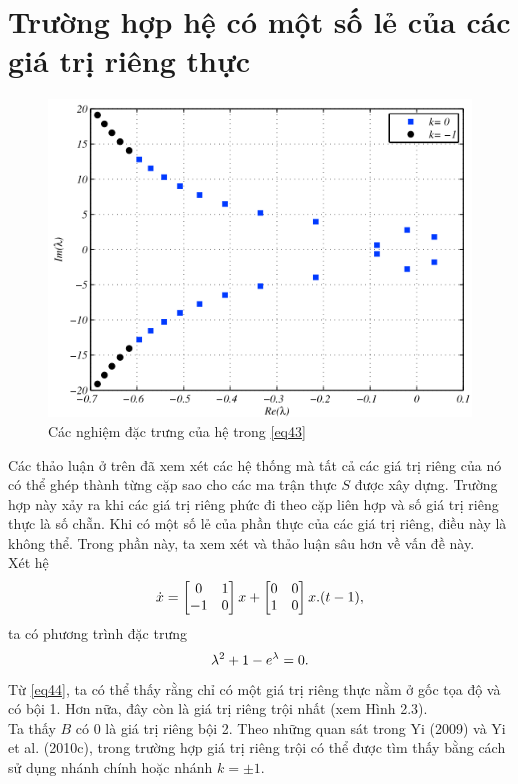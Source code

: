 \section{Trường hợp hệ có một số lẻ của các giá trị riêng thực}
\begin{figure}[h!]
	\centering
	\includegraphics[scale= 0.7]{"./Hinh/Hinh 3"}
	\caption[Các nghiệm đặc trưng của hệ trong  \eqref{43} ] {Các nghiệm đặc trưng của hệ trong  \eqref{eq43}}
	\label{fig:hinh-2}
\end{figure}
Các thảo luận ở trên đã xem xét các hệ thống mà tất cả các giá trị riêng của nó có thể ghép thành từng cặp sao cho các ma trận thực $S$ được xây dựng. 
Trường hợp này xảy ra khi các giá trị riêng phức đi theo cặp liên hợp và số giá trị riêng thực là số chẵn. Khi có một số lẻ của phần thực của các giá trị riêng, điều này là không thể. Trong phần này, ta xem xét và thảo luận sâu hơn về vấn đề này.\\
Xét hệ
\begin{equation}\label{eq43}
\dot{x} = \begin{bmatrix} 0 & 1\\ - 1 & 0 \end{bmatrix}x + \begin{bmatrix} 0 & 0 \\ 1 & 0 \end{bmatrix}x.(t - 1),
\end{equation}
ta có phương trình đặc trưng
\begin{equation}\label{eq44}
	\lambda^2 + 1 - e^{\lambda} = 0.
\end{equation}
Từ \eqref{eq44}, ta có thể thấy rằng chỉ có một giá trị riêng thực nằm ở gốc tọa độ và có bội 1. Hơn nữa, đây còn là giá trị riêng trội nhất (xem Hình 2.3).\\
Ta thấy $B$ có $0$ là giá trị riêng bội 2. Theo những quan sát trong Yi (2009) và Yi et al. (2010c), trong trường hợp giá trị riêng trội có thể được tìm thấy bằng cách sử dụng nhánh chính hoặc nhánh $k = \pm1$.\\

